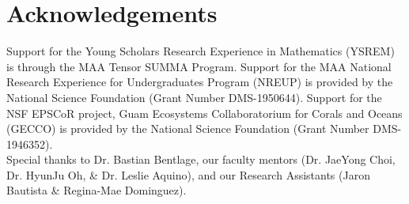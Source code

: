 \documentclass[12pt]{article}
\begin{document}
\section{Acknowledgements}
Support for the Young Scholars Research Experience in Mathematics (YSREM)  is through the MAA Tensor SUMMA Program. Support for the MAA National Research Experience for Undergraduates Program (NREUP) is provided by the National Science Foundation (Grant Number DMS-1950644). Support for the NSF EPSCoR project, Guam Ecosystems Collaboratorium for Corals and Oceans (GECCO) is provided by the National Science Foundation (Grant Number DMS-1946352).\\ 

Special thanks to Dr. Bastian Bentlage, our faculty mentors (Dr. JaeYong Choi, Dr. HyunJu Oh, \& Dr. Leslie Aquino), and our Research Assistants (Jaron Bautista \& Regina-Mae Dominguez).

\newpage
% 
% 
\printbibliography
\end{document}
